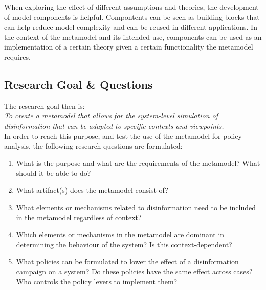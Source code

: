 When exploring the effect of different assumptions and theories, the development of model components is helpful. Compontents can be seen as building blocks that can help reduce model complexity \citep{Huang2013} and can be reused in different applications. In the context of the metamodel and its intended use, components can be used as an implementation of a certain theory given a certain functionality the metamodel requires. 

\begin{comment}
Need to address this: 

This purpose is not so very different from that of exploratory modeling as described by Bankes (1993). He proposed exploratory modeling as an approach in cases where there is insufficient or uncertain knowledge about the system of interest. Exploratory modeling explores the consequences of changing assumptions or mechanisms through simulation experiments.
\end{comment}





\subsection{Research Goal \& Questions}
The research goal then is: \\

\textit{To create a metamodel that allows for the system-level simulation of disinformation that can be adapted to specific contexts and viewpoints.} \\

In order to reach this purpose, and test the use of the metamodel for policy analysis, the following research questions are formulated: 
\begin{enumerate}
	\item What is the purpose and what are the requirements of the metamodel? What should it be able to do?
	\item What artifact(s) does the metamodel consist of?
	\item What elements or mechanisms related to disinformation need to be included in the metamodel regardless of context? %
	\item Which elements or mechanisms in the metamodel are dominant in determining the behaviour of the system? Is this context-dependent?
	\item What policies can be formulated to lower the effect of a disinformation campaign on a system? Do these policies have the same effect across cases? Who controls the policy levers to implement them?
\end{enumerate}




